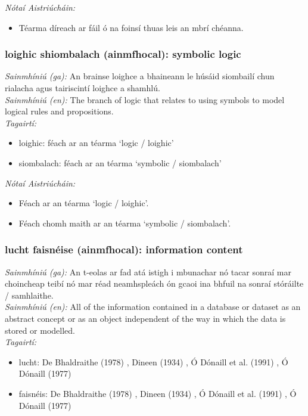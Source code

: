  \noindent \textit{Nótaí Aistriúcháin:}
\begin{itemize}
	\item Téarma díreach ar fáil ó na foinsí thuas leis an mbrí chéanna.
\end{itemize}


\subsubsection*{loighic shiombalach (ainmfhocal): symbolic logic}
 \noindent \textit{Sainmhíniú (ga):} An brainse loighce a bhaineann le húsáid siombailí chun rialacha agus tairiscintí loighce a shamhlú.
\\
 \noindent \textit{Sainmhíniú (en):} The branch of logic that relates to using symbols to model logical rules and propositions.
\\
 \noindent \textit{Tagairtí:}
\begin{itemize}
	\item loighic: féach ar an téarma `logic / loighic'
	\item siombalach: féach ar an téarma `symbolic / siombalach'
\end{itemize}

 \noindent \textit{Nótaí Aistriúcháin:}
\begin{itemize}
	\item Féach ar an téarma `logic / loighic'.
	\item Féach chomh maith ar an téarma `symbolic / siombalach'.
\end{itemize}


\subsubsection*{lucht faisnéise (ainmfhocal): information content}
 \noindent \textit{Sainmhíniú (ga):} An t-eolas ar fad atá istigh i mbunachar nó tacar sonraí mar choincheap teibí nó mar réad neamhspleách ón gcaoi ina bhfuil na sonraí stóráilte / samhlaithe.
\\
 \noindent \textit{Sainmhíniú (en):} All of the information contained in a database or dataset as an abstract concept or as an object independent of the way in which the data is stored or modelled.
\\
 \noindent \textit{Tagairtí:}
\begin{itemize}
	\item lucht: De Bhaldraithe (1978) \cite{de-bhaldraithe}, Dineen (1934) \cite{dineen}, Ó Dónaill et al. (1991) \cite{focloir-beag}, Ó Dónaill (1977) \cite{odonaill}
	\item faisnéis: De Bhaldraithe (1978) \cite{de-bhaldraithe}, Dineen (1934) \cite{dineen}, Ó Dónaill et al. (1991) \cite{focloir-beag}, Ó Dónaill (1977) \cite{odonaill}
\end{itemize}

